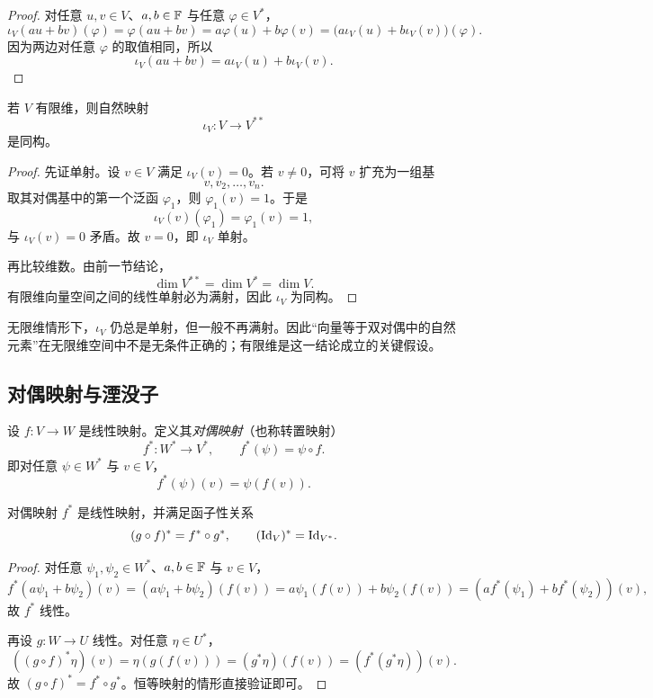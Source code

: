 \begin{proof}
对任意 $u,v\in V$、$a,b\in\mathbb{F}$ 与任意 $\varphi\in V^*$，
\[
  \iota_V(au+bv)(\varphi)=\varphi(au+bv)=a\varphi(u)+b\varphi(v)
  =\bigl(a\iota_V(u)+b\iota_V(v)\bigr)(\varphi).
\]
因为两边对任意 $\varphi$ 的取值相同，所以
\[
  \iota_V(au+bv)=a\iota_V(u)+b\iota_V(v).
\]
\end{proof}

\begin{theorem}
若 $V$ 有限维，则自然映射
\[
  \iota_V\colon V\to V^{**}
\]
是同构。
\end{theorem}

\begin{proof}
先证单射。设 $v\in V$ 满足 $\iota_V(v)=0$。若 $v\neq 0$，可将 $v$ 扩充为一组基
\[
  v,v_2,\dots,v_n.
\]
取其对偶基中的第一个泛函 $\varphi_1$，则 $\varphi_1(v)=1$。于是
\[
  \iota_V(v)(\varphi_1)=\varphi_1(v)=1,
\]
与 $\iota_V(v)=0$ 矛盾。故 $v=0$，即 $\iota_V$ 单射。

再比较维数。由前一节结论，
\[
  \dim V^{**}=\dim V^*=\dim V.
\]
有限维向量空间之间的线性单射必为满射，因此 $\iota_V$ 为同构。
\end{proof}

\begin{remark}
无限维情形下，$\iota_V$ 仍总是单射，但一般不再满射。因此“向量等于双对偶中的自然元素”在无限维空间中不是无条件正确的；有限维是这一结论成立的关键假设。
\end{remark}

\subsection{对偶映射与湮没子}

\begin{definition}
设 $f\colon V\to W$ 是线性映射。定义其\emph{对偶映射}（也称转置映射）
\[
  f^*\colon W^*\to V^*,
  \qquad
  f^*(\psi)=\psi\circ f.
\]
即对任意 $\psi\in W^*$ 与 $v\in V$，
\[
  f^*(\psi)(v)=\psi(f(v)).
\]
\end{definition}

\begin{proposition}
对偶映射 $f^*$ 是线性映射，并满足函子性关系
\[
  (g\circ f)^*=f^*\circ g^*,
  \qquad
  (\mathrm{Id}_V)^*=\mathrm{Id}_{V^*}.
\]
\end{proposition}

\begin{proof}
对任意 $\psi_1,\psi_2\in W^*$、$a,b\in\mathbb{F}$ 与 $v\in V$，
\[
  f^*(a\psi_1+b\psi_2)(v)
  =(a\psi_1+b\psi_2)(f(v))
  =a\psi_1(f(v))+b\psi_2(f(v))
  =(af^*(\psi_1)+bf^*(\psi_2))(v),
\]
故 $f^*$ 线性。

再设 $g\colon W\to U$ 线性。对任意 $\eta\in U^*$，
\[
  ((g\circ f)^*\eta)(v)=\eta(g(f(v)))=(g^*\eta)(f(v))=(f^*(g^*\eta))(v).
\]
故 $(g\circ f)^*=f^*\circ g^*$。恒等映射的情形直接验证即可。
\end{proof}

